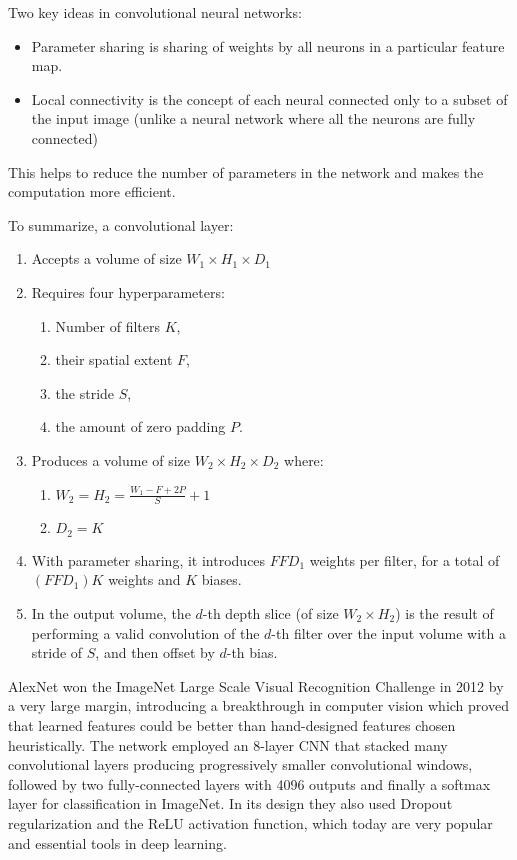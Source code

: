 Two key ideas in convolutional neural networks:

\begin{itemize}
    \item Parameter sharing is sharing of weights by all neurons in a particular feature map.
    \item Local connectivity is the concept of each neural connected only to a subset of the input image (unlike a neural network where all the neurons are fully connected)
\end{itemize}

This helps to reduce the number of parameters in the network and makes the computation more efficient.

To summarize, a convolutional layer:

\begin{enumerate}
    \item Accepts a volume of size $W_1 \times H_1 \times D_1$
    \item Requires four hyperparameters:
    \begin{enumerate}
        \item Number of filters $K$,
        \item their spatial extent $F$,
        \item the stride $S$,
        \item the amount of zero padding $P$.
    \end{enumerate}
    \item Produces a volume of size $W_2 \times H_2 \times D_2$ where:
    \begin{enumerate}
        \item $W_2 = H_2 = \frac{W_1 - F + 2P}{S} + 1$
        \item $D_2 = K$
    \end{enumerate}
    \item With parameter sharing, it introduces $F F D_1$ weights per filter, for a total of $(F F D_1) K$ weights and $K$ biases.
    \item In the output volume, the $d$-th depth slice (of size $W_2 \times H_2$) is the result of performing a valid convolution of the $d$-th filter over the input volume with a stride of $S$, and then offset by $d$-th bias.
\end{enumerate}

AlexNet\cite{alexnet} won the ImageNet Large Scale Visual Recognition Challenge \cite{imagenet} in 2012 by a very large margin, introducing a breakthrough in computer vision which proved that learned features could be better than hand-designed features chosen heuristically. The network employed an 8-layer \ac{CNN} that stacked many convolutional layers producing progressively smaller convolutional windows, followed by two fully-connected layers with 4096 outputs and finally a softmax layer for classification in ImageNet. In its design they also used Dropout regularization and the ReLU activation function, which today are very popular and essential tools in deep learning.

